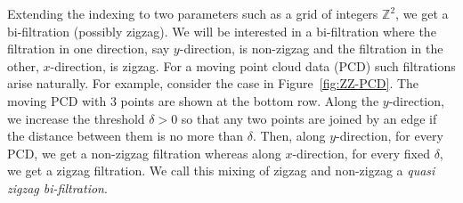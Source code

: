 \documentclass{article}
\theoremstyle{plain}
\theoremstyle{definition}
\theoremstyle{remark}
\begin{document}


Extending the indexing to two parameters such as a grid of integers
$\mathbb{Z}^2$, we get a bi-filtration (possibly zigzag). We will be interested
in a bi-filtration where the filtration in one direction, say $y$-direction,
is non-zigzag and the filtration in the other, $x$-direction, is zigzag.
For a moving point cloud data (PCD) such filtrations arise naturally. For example, consider
the case in Figure~\ref{fig:ZZ-PCD}. The moving PCD with 3 points are
shown at the bottom row. Along the $y$-direction, we increase the threshold
$\delta>0$ so that any two points are joined by an edge if the distance
between them is no more than $\delta$. Then, along $y$-direction, for every
PCD, we get a non-zigzag filtration whereas along $x$-direction, for every
fixed $\delta$, we get a zigzag filtration. We call this mixing of zigzag
and non-zigzag a \emph{quasi zigzag bi-filtration}.


\end{document}
